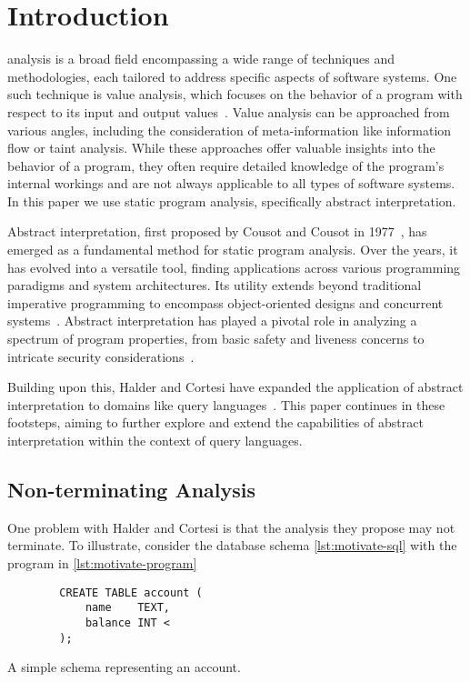 \section{Introduction}\label{sec:introduction}
 analysis is a broad field encompassing a wide range of techniques and methodologies, each tailored to address specific aspects of software systems.
One such technique is value analysis, which focuses on the behavior of a program with respect to its input and output values~\cite{jackson_software_2000}.
Value analysis can be approached from various angles, including the consideration of meta-information like information flow or taint analysis.
While these approaches offer valuable insights into the behavior of a program, they often require detailed knowledge of the program's internal workings and are not always applicable to all types of software systems.
In this paper we use static program analysis, specifically abstract interpretation.

Abstract interpretation, first proposed by Cousot and Cousot in 1977~\cite{cousot_abstract_1977}, has emerged as a fundamental method for static program analysis.
Over the years, it has evolved into a versatile tool, finding applications across various programming paradigms and system architectures.
Its utility extends beyond traditional imperative programming to encompass object-oriented designs and concurrent systems~\cite{gustafsson_analyzing_2013, mine_static_2023}.
Abstract interpretation has played a pivotal role in analyzing a spectrum of program properties, from basic safety and liveness concerns to intricate security considerations~\cite{mastroeni_abstract_2011}.

Building upon this, Halder and Cortesi have expanded the application of abstract interpretation to domains like query languages~\cite{halder_abstract_2012}.
This paper continues in these footsteps, aiming to further explore and extend the capabilities of abstract interpretation within the context of query languages.


\subsection{Non-terminating Analysis}\label{subsec:non-terminating-analysis}
One problem with Halder and Cortesi is that the analysis they propose may not terminate.
To illustrate, consider the database schema \autoref{lst:motivate-sql} with the program in \autoref{lst:motivate-program}


\begin{listing}
    \begin{verbatim}
        CREATE TABLE account (
            name    TEXT,
            balance INT <
        );
    \end{verbatim}
    \caption{A simple schema representing an account.}
    \label{lst:motivate-sql}
\end{listing}



